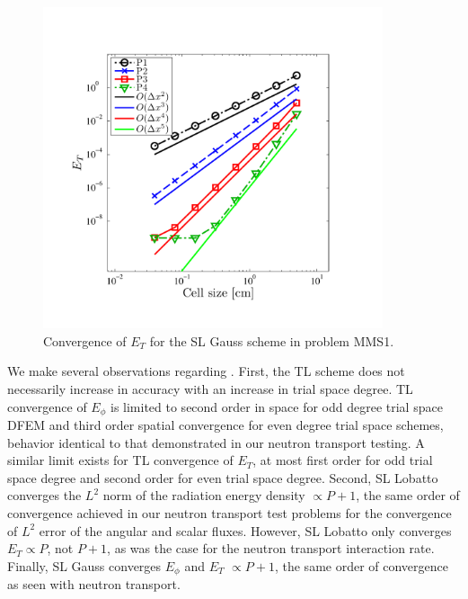 \begin{figure}[!hbp]
\centering
\includegraphics[width=10cm,trim=0.25in  0.5in 0.75in 0.75in,clip=true]{chapter6_grey_radtran/Dissertation_Data/MMS2_SLXS_Gauss_temp_L2.pdf}
\caption{Convergence of $E_{T}$ for the SL Gauss scheme in problem MMS1.}
\label{fig:mms1_gauss_temp}
\end{figure}

We make several observations regarding .  
First, the TL scheme does not necessarily increase in accuracy with an increase in trial space degree.
TL convergence of $E_{\phi}$ is limited to second order in space for odd degree trial space DFEM and third order spatial convergence for even degree trial space schemes, behavior identical to that demonstrated in our neutron transport testing.
A similar limit exists for TL convergence of $E_T$, at most first order for odd trial space degree and second order for even trial space degree.
Second, SL Lobatto converges the $L^2$ norm of the radiation energy density $\propto P+1$, the same order of convergence achieved in our neutron transport test problems for the convergence of $L^2$ error of the angular and scalar fluxes.
However, SL Lobatto only converges $E_T \propto P$, not $P+1$, as was the case for the neutron transport interaction rate.
Finally, SL Gauss converges $E_{\phi}$ and $E_T$ $\propto P+1$, the same order of convergence as seen with neutron transport.


